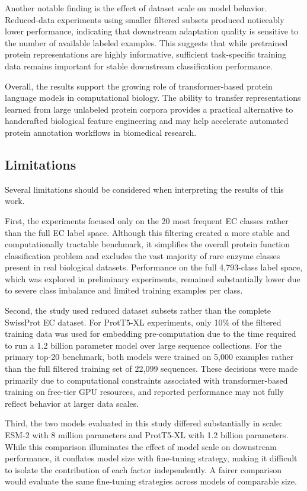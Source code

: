\documentclass{article}
\begin{document}
Another notable finding is the effect of dataset scale on model behavior. Reduced-data experiments using smaller filtered subsets produced noticeably lower performance, indicating that downstream adaptation quality is sensitive to the number of available labeled examples. This suggests that while pretrained protein representations are highly informative, sufficient task-specific training data remains important for stable downstream classification performance.

Overall, the results support the growing role of transformer-based protein language models in computational biology. The ability to transfer representations learned from large unlabeled protein corpora provides a practical alternative to handcrafted biological feature engineering and may help accelerate automated protein annotation workflows in biomedical research.

\subsection{Limitations}

Several limitations should be considered when interpreting the results of this work.

First, the experiments focused only on the 20 most frequent EC classes rather than the full EC label space. Although this filtering created a more stable and computationally tractable benchmark, it simplifies the overall protein function classification problem and excludes the vast majority of rare enzyme classes present in real biological datasets. Performance on the full 4,793-class label space, which was explored in preliminary experiments, remained substantially lower due to severe class imbalance and limited training examples per class.

Second, the study used reduced dataset subsets rather than the complete SwissProt EC dataset. For ProtT5-XL experiments, only 10\% of the filtered training data was used for embedding pre-computation due to the time required to run a 1.2 billion parameter model over large sequence collections. For the primary top-20 benchmark, both models were trained on 5,000 examples rather than the full filtered training set of 22,099 sequences. These decisions were made primarily due to computational constraints associated with transformer-based training on free-tier GPU resources, and reported performance may not fully reflect behavior at larger data scales.

Third, the two models evaluated in this study differed substantially in scale: ESM-2 with 8 million parameters and ProtT5-XL with 1.2 billion parameters. While this comparison illuminates the effect of model scale on downstream performance, it conflates model size with fine-tuning strategy, making it difficult to isolate the contribution of each factor independently. A fairer comparison would evaluate the same fine-tuning strategies across models of comparable size.
\end{document}
